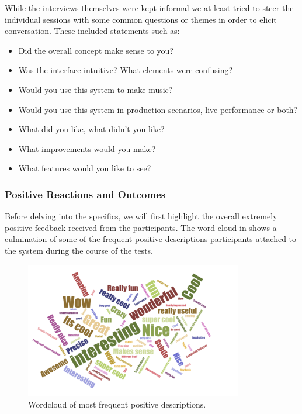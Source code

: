 While the interviews themselves were kept informal we at least tried to steer the individual sessions with some common questions or themes in order to elicit conversation. These included statements such as:

\begin{itemize}
  \item Did the overall concept make sense to you?
  \item Was the interface intuitive? What elements were confusing?
  \item Would you use this system to make music?
  \item Would you use this system in production scenarios, live performance or both?
  \item What did you like, what didn’t you like?
  \item What improvements would you make?
  \item What features would you like to see?
\end{itemize}

\subsubsection{Positive Reactions and Outcomes}

Before delving into the specifics, we will first highlight the overall extremely positive feedback received from the participants. The word cloud in  shows a culmination of some of the frequent positive descriptions participants attached to the system during the course of the tests.

\begin{figure}
	\begin{center}
		\includegraphics[width=0.85\textwidth]{ch07_evaluation/figures/wordcloud.png}
	\end{center}
	\caption[Wordcloud of most frequent positive descriptions from the user survey]{Wordcloud of most frequent positive descriptions.}
	\label{fig:wordcloud}
\end{figure}

